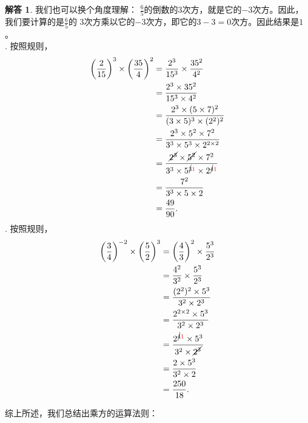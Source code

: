 \documentclass[12pt,UTF8]{ctexbook}
\theoremstyle{definition}
\newtheorem*{so}{解答}
\theoremstyle{plain}
\begin{document}
\begin{so}
    我们也可以换个角度理解：
    $\frac{6}{5}$的倒数的$3$次方，就是它的$-3$次方。因此，我们要计算的是$\frac{6}{5}$的
    $3$次方乘以它的$-3$次方，即它的$3-3=0$次方。因此结果是$1$。\\
    . 按照规则，
    \begin{align*}
        \left(\frac{2}{15}\right)^3\times \left(\frac{35}{4}\right)^2 &= \frac{2^3}{15^3}\times \frac{35^2}{4^2} \\
        &= \frac{2^3\times 35^2}{15^3\times 4^2} \\
        &= \frac{2^3\times (5\times 7)^2}{(3\times 5)^3\times (2^2)^2} \\
        &= \frac{2^3\times 5^2 \times 7^2}{3^3\times 5^{3} \times 2^{2\times 2}} \\
        &= \frac{\cancel{2^3}\times \cancel{5^2} \times 7^2}{3^3\times 5^{\cancel{3}{\color{red} 1}} \times 2^{\cancel{4}{\color{red} 1}}} \\
        &= \frac{7^2}{3^3\times 5 \times 2} \\
        &= \frac{49}{90}.
    \end{align*}
    . 按照规则，
    \begin{align*}
        \left(\frac{3}{4}\right)^{-2}\times \left(\frac{5}{2}\right)^3 &= \left(\frac{4}{3}\right)^2\times \frac{5^3}{2^3} \\
        &= \frac{4^2}{3^2} \times \frac{5^3}{2^3} \\
        &= \frac{(2^2)^2 \times 5^3}{3^2\times 2^3} \\
        &= \frac{2^{2\times 2} \times 5^3}{3^2 \times 2^3} \\
        &= \frac{2^{\cancel{4}{\color{red} 1}} \times 5^3}{3^2 \times \cancel{2^3}} \\
        &= \frac{2 \times 5^3}{3^2\times 2} \\
        &= \frac{250}{18}.
    \end{align*}
\end{so}

综上所述，我们总结出乘方的运算法则：
\begin{center}
\end{center}
\end{document}
